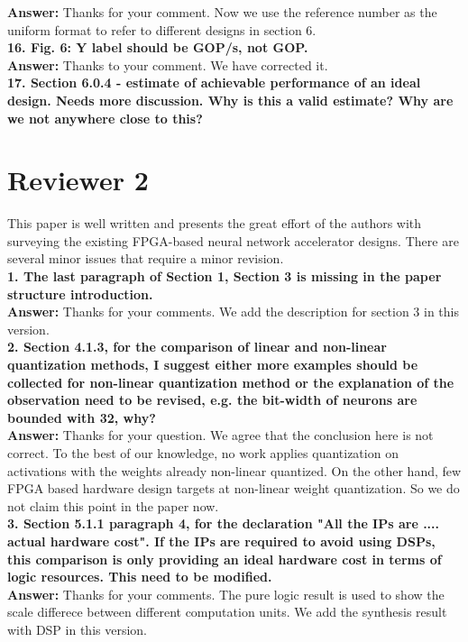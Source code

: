 \documentclass[12pt]{paper}
\newcommand{\reviewer}[1]{\section*{Reviewer #1}}
\newcommand{\answer}[1]{\noindent\textbf{Answer:} #1}
\newcommand{\comment}[1]{\noindent\textbf{#1}\\}
\begin{document}
\answer{Thanks for your comment. Now we use the reference number as the uniform format to refer to different designs in section 6.} \\

\comment{16. Fig. 6: Y label should be GOP/s, not GOP.}

\answer{Thanks to your comment. We have corrected it.}\\

\comment{17. Section 6.0.4 - estimate of achievable performance of an ideal design. Needs more discussion. Why is this a valid estimate? Why are we not anywhere close to this?}

\reviewer{2}

This paper is well written and presents the great effort of the authors with surveying the existing FPGA-based neural network accelerator designs. There are several minor issues that require a minor revision.\\

\comment{1.	The last paragraph of Section 1, Section 3 is missing in the paper structure introduction.}

\answer{Thanks for your comments. We add the description for section 3 in this version.}\\

\comment{2. Section 4.1.3, for the comparison of linear and non-linear quantization methods, I suggest either more examples should be collected for non-linear quantization method or the explanation of the observation need to be revised, e.g. the bit-width of neurons are bounded with 32, why?}

\answer{Thanks for your question. We agree that the conclusion here is not correct. To the best of our knowledge, no work applies quantization on activations with the weights already non-linear quantized. On the other hand, few FPGA based hardware design targets at non-linear weight quantization. So we do not claim this point in the paper now.}\\

\comment{3.	Section 5.1.1 paragraph 4, for the declaration "All the IPs are .... actual hardware cost". If the IPs are required to avoid using DSPs, this comparison is only providing an ideal hardware cost in terms of logic resources. This need to be modified.}

\answer{Thanks for your comments. The pure logic result is used to show the scale differece between different computation units. We add the synthesis result with DSP in this version.} \\
\end{document}
